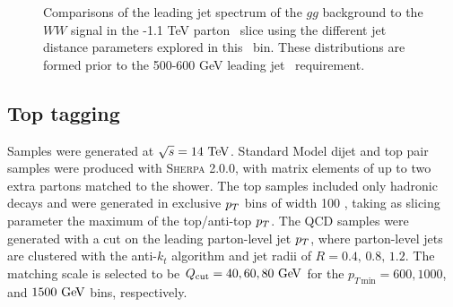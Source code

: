 \begin{figure}
\begin{center}
\caption{Comparisons of the leading jet \pt spectrum of the $gg$
  background to the $WW$ signal in the -1.1 TeV parton \pt~slice using the
  different \antikt jet distance parameters explored in this \pt~bin. These
  distributions are formed prior to the 500-600 GeV leading jet \pt~requirement.}
\label{fig:pt1000_basics}
\end{center}
\end{figure}


\subsection{Top tagging}
Samples were generated at $\sqrt{s}=14\TeV$. Standard Model dijet and top pair
samples were produced with \textsc{Sherpa} 2.0.0, with matrix elements of up
to two extra partons matched to the shower. The top samples included only
hadronic decays and  were generated in exclusive $p_T$ bins of width 100 \GeV,
taking as slicing parameter the maximum of the top/anti-top $p_T$. The QCD
samples were generated with a cut on the leading parton-level jet $p_T$, where
parton-level jets are clustered with the anti-$k_t$ algorithm and jet radii of
$R= 0.4,\,0.8,\,1.2$. The matching scale is selected to be $Q_{\rm cut}=40, 60, 80 \GeV$ for
the $p_{T\,\text{min}}=600, 1000$, and $1500 \GeV$ bins, respectively.
 
